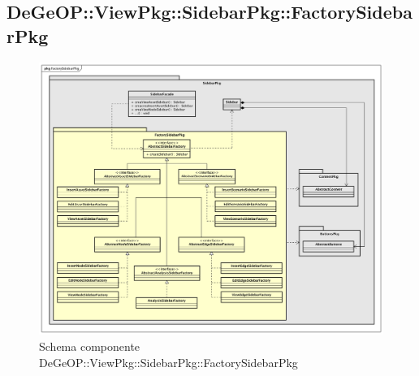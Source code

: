 \subsection{DeGeOP::ViewPkg::SidebarPkg::FactorySidebarPkg}
\label{pkg::FactorySidebarPkg}
\begin{figure}[H]
	\centering
	\includegraphics[width=\textwidth]{img/PkgDiagram/FactorySidebarPkg.png}
	\caption{Schema componente DeGeOP::ViewPkg::SidebarPkg::FactorySidebarPkg}
\end{figure}
